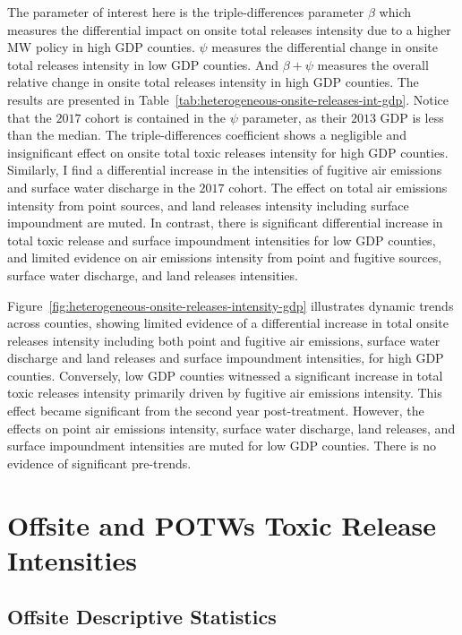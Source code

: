 \documentclass[authoryear, preprint, twocolumn, 1p]{elsarticle}
\begin{document}
    The parameter of interest here is the triple-differences parameter $\beta$ which measures the differential impact on onsite total releases intensity due to a higher MW policy in high GDP counties. $\psi$ measures the differential change in onsite total releases intensity in low GDP counties. And $\beta + \psi$ measures the overall relative change in onsite total releases intensity in high GDP counties. The results are presented in Table~\ref{tab:heterogeneous-onsite-releases-int-gdp}. Notice that the $2017$ cohort is contained in the $\psi$ parameter, as their $2013$ GDP is less than the median. The triple-differences coefficient shows a negligible and insignificant effect on onsite total toxic releases intensity for high GDP counties. Similarly, I find a differential increase in the intensities of fugitive air emissions and surface water discharge in the $2017$ cohort. The effect on total air emissions intensity from point sources, and land releases intensity including surface impoundment are muted. In contrast, there is significant differential increase in total toxic release and surface impoundment intensities for low GDP counties, and limited evidence on air emissions intensity from point and fugitive sources, surface water discharge, and land releases intensities.
    
    

    Figure~\ref{fig:heterogeneous-onsite-releases-intensity-gdp} illustrates dynamic trends across counties, showing limited evidence of a differential increase in total onsite releases intensity including both point and fugitive air emissions, surface water discharge and land releases and surface impoundment intensities, for high GDP counties. Conversely, low GDP counties witnessed a significant increase in total toxic releases intensity primarily driven by fugitive air emissions intensity. This effect became significant from the second year post-treatment. However, the effects on point air emissions intensity, surface water discharge, land releases, and surface impoundment intensities are muted for low GDP counties. There is no evidence of significant pre-trends.


    \section{Offsite and POTWs Toxic Release Intensities}\label{sec:offsite-and-potws-toxic-release-intensities}

    \subsection{Offsite Descriptive Statistics}\label{subsec:offsite-descriptive-statistics}
    
    
\end{document}
